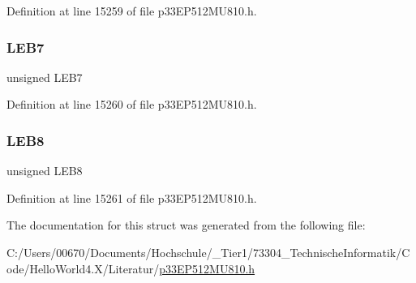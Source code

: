 Definition at line 15259 of file p33\+E\+P512\+M\+U810.\+h.

\mbox{\label{structtag_l_e_b_d_l_y5_b_i_t_s_aa76d586b04119d8459718019ddd964ef}} 
\subsubsection{\texorpdfstring{L\+E\+B7}{LEB7}}
{\footnotesize\ttfamily unsigned L\+E\+B7}



Definition at line 15260 of file p33\+E\+P512\+M\+U810.\+h.

\mbox{\label{structtag_l_e_b_d_l_y5_b_i_t_s_a9b22b47001301c6ae00c3eea0f385091}} 
\subsubsection{\texorpdfstring{L\+E\+B8}{LEB8}}
{\footnotesize\ttfamily unsigned L\+E\+B8}



Definition at line 15261 of file p33\+E\+P512\+M\+U810.\+h.



The documentation for this struct was generated from the following file\+:\begin{DoxyCompactItemize}
\item 
C\+:/\+Users/00670/\+Documents/\+Hochschule/\+\_\+\+Tier1/73304\+\_\+\+Technische\+Informatik/\+Code/\+Hello\+World4.\+X/\+Literatur/\hyperlink{p33_e_p512_m_u810_8h}{p33\+E\+P512\+M\+U810.\+h}\end{DoxyCompactItemize}
